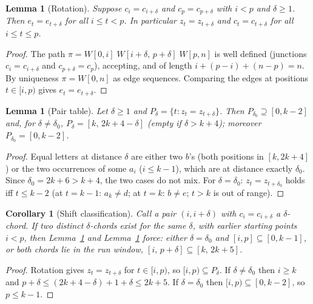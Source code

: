 \documentclass[11pt]{article}
\newtheorem{lemma}[theorem]{Lemma}
\newtheorem{corollary}[theorem]{Corollary}
\theoremstyle{definition}
\begin{document}
\begin{lemma}[Rotation]\label{lem:rotation}
Suppose $c_i=c_{i+\delta}$ and $c_p=c_{p+\delta}$ with $i<p$ and $\delta\ge1$.
Then $e_t=e_{t+\delta}$ for all $i\le t<p$. In particular
$z_t=z_{t+\delta}$ and $c_t=c_{t+\delta}$ for all $i\le t\le p$.
\end{lemma}

\begin{proof}
The path $\pi=W[0,i]\;W[i+\delta,\,p+\delta]\;W[p,n]$ is well defined
(junctions $c_i=c_{i+\delta}$ and $c_{p+\delta}=c_p$), accepting, and of
length $i+(p-i)+(n-p)=n$. By uniqueness $\pi=W[0,n]$ as edge sequences.
Comparing the edges at positions $t\in[i,p)$ gives $e_t=e_{t+\delta}$.
\end{proof}

\begin{lemma}[Pair table]\label{lem:pairs}
Let $\delta\ge1$ and $P_\delta=\{t: z_t=z_{t+\delta}\}$. Then
$P_{\delta_0}\supseteq[0,k-2]$ and, for $\delta\neq\delta_0$,
$P_\delta=[k,\,2k+4-\delta]$ (empty if $\delta>k+4$); moreover
$P_{\delta_0}=[0,k-2]$.
\end{lemma}

\begin{proof}
Equal letters at distance $\delta$ are either two $b$'s (both positions in
$[k,2k+4]$) or the two occurrences of some $a_i$ ($i\le k-1$), which are at
distance exactly $\delta_0$. Since $\delta_0=2k+6>k+4$, the two cases do not
mix. For $\delta=\delta_0$: $z_t=z_{t+\delta_0}$ holds iff $t\le k-2$
(at $t=k-1$: $a_k\ne d$; at $t=k$: $b\ne e$; $t>k$ is out of range).
\end{proof}

\begin{corollary}[Shift classification]\label{cor:shifts}
Call a pair $(i,i+\delta)$ with $c_i=c_{i+\delta}$ a \emph{$\delta$-chord}.
If two distinct $\delta$-chords exist for the same $\delta$, with earlier
starting points $i<p$, then Lemma~\ref{lem:rotation} and
Lemma~\ref{lem:pairs} force: either $\delta=\delta_0$ and $[i,p]\subseteq
[0,k-1]$, or both chords lie in the run window,
$[i,\,p+\delta]\subseteq[k,\,2k+5]$.
\end{corollary}

\begin{proof}
Rotation gives $z_t=z_{t+\delta}$ for $t\in[i,p)$, so $[i,p)\subseteq
P_\delta$. If $\delta\ne\delta_0$ then $i\ge k$ and $p+\delta\le
(2k+4-\delta)+1+\delta\le 2k+5$. If $\delta=\delta_0$ then
$[i,p)\subseteq[0,k-2]$, so $p\le k-1$.
\end{proof}
\end{document}
